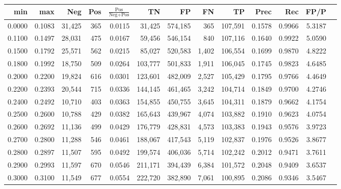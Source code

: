 \begin{tabular}{rrrrrrrrrrrrr}
\toprule
   min &    max &    Neg &   Pos & $\frac{\text{Pos}}{\text{Neg}+\text{Pos}}$ &      TN &      FP &      FN &      TP &   Prec &    Rec &   FP/P \\
\midrule
0.0000 & 0.1083 & 31,425 &   365 &                                     0.0115 &  31,425 & 574,185 &     365 & 107,591 & 0.1578 & 0.9966 & 5.3187 \\
0.1100 & 0.1497 & 28,031 &   475 &                                     0.0167 &  59,456 & 546,154 &     840 & 107,116 & 0.1640 & 0.9922 & 5.0590 \\
0.1500 & 0.1792 & 25,571 &   562 &                                     0.0215 &  85,027 & 520,583 &   1,402 & 106,554 & 0.1699 & 0.9870 & 4.8222 \\
0.1800 & 0.1992 & 18,750 &   509 &                                     0.0264 & 103,777 & 501,833 &   1,911 & 106,045 & 0.1745 & 0.9823 & 4.6485 \\
0.2000 & 0.2200 & 19,824 &   616 &                                     0.0301 & 123,601 & 482,009 &   2,527 & 105,429 & 0.1795 & 0.9766 & 4.4649 \\
0.2200 & 0.2393 & 20,544 &   715 &                                     0.0336 & 144,145 & 461,465 &   3,242 & 104,714 & 0.1849 & 0.9700 & 4.2746 \\
0.2400 & 0.2492 & 10,710 &   403 &                                     0.0363 & 154,855 & 450,755 &   3,645 & 104,311 & 0.1879 & 0.9662 & 4.1754 \\
0.2500 & 0.2600 & 10,788 &   429 &                                     0.0382 & 165,643 & 439,967 &   4,074 & 103,882 & 0.1910 & 0.9623 & 4.0754 \\
0.2600 & 0.2692 & 11,136 &   499 &                                     0.0429 & 176,779 & 428,831 &   4,573 & 103,383 & 0.1943 & 0.9576 & 3.9723 \\
0.2700 & 0.2800 & 11,288 &   546 &                                     0.0461 & 188,067 & 417,543 &   5,119 & 102,837 & 0.1976 & 0.9526 & 3.8677 \\
0.2800 & 0.2897 & 11,507 &   595 &                                     0.0492 & 199,574 & 406,036 &   5,714 & 102,242 & 0.2012 & 0.9471 & 3.7611 \\
0.2900 & 0.2993 & 11,597 &   670 &                                     0.0546 & 211,171 & 394,439 &   6,384 & 101,572 & 0.2048 & 0.9409 & 3.6537 \\
0.3000 & 0.3100 & 11,549 &   677 &                                     0.0554 & 222,720 & 382,890 &   7,061 & 100,895 & 0.2086 & 0.9346 & 3.5467 \\

\end{tabular}
